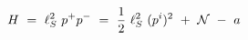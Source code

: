 \begin{equation}
H~=~\ell^2_S~ p^+p^- ~=~ \frac{1}{2}~\ell_S^2~ (p^i)^2 
 ~+~ {\cal N} ~-~ a 
\end{equation}

